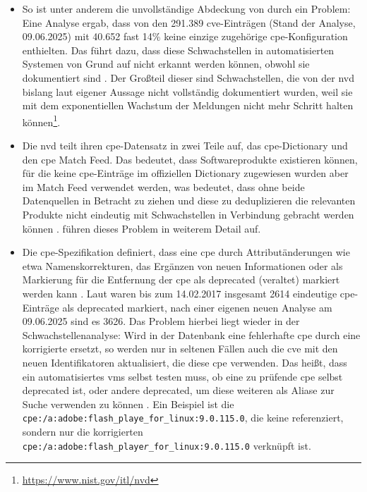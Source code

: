 \begin{itemize}
    \item So ist unter anderem die unvollständige Abdeckung von  durch  ein Problem:
    Eine Analyse ergab, dass von den 291.389 \acrshort{cve}-Einträgen (Stand der Analyse, 09.06.2025) mit 40.652 fast 14\% keine einzige zugehörige \acrshort{cpe}-Konfiguration enthielten.
    Das führt dazu, dass diese Schwachstellen in automatisierten Systemen von Grund auf nicht erkannt werden können, obwohl sie dokumentiert sind \autocite{Sanguino_Uetz_2017}.
    Der Großteil dieser  sind Schwachstellen, die von der \acrshort{nvd} bislang laut eigener Aussage nicht vollständig dokumentiert wurden, weil sie mit dem exponentiellen Wachstum der Meldungen nicht mehr Schritt halten können\footnote{\url{https://www.nist.gov/itl/nvd}}.

    \item Die \acrshort{nvd} teilt ihren \acrshort{cpe}-Datensatz in zwei Teile auf, das \acrshort{cpe}-Dictionary \autocite{Cichonski_Waltermire_Scarfone_2011} und den \acrshort{cpe} Match Feed.
    Das bedeutet, dass Softwareprodukte existieren können, für die keine \acrshort{cpe}-Einträge im offiziellen Dictionary zugewiesen wurden aber im Match Feed verwendet werden, was bedeutet, dass ohne beide Datenquellen in Betracht zu ziehen und diese zu deduplizieren die relevanten Produkte nicht eindeutig mit Schwachstellen in Verbindung gebracht werden können \autocite{Sanguino_Uetz_2017}.
    \textcite{Sanguino_Uetz_2017} führen dieses Problem in weiterem Detail auf.

    \item Die \acrshort{cpe}-Spezifikation definiert, dass eine \acrshort{cpe} durch Attributänderungen wie etwa Namenskorrekturen, das Ergänzen von neuen Informationen oder als Markierung für die Entfernung der \acrshort{cpe} als deprecated (veraltet) markiert werden kann \autocite{Cichonski_Waltermire_Scarfone_2011}.
    Laut \textcite{Sanguino_Uetz_2017} waren bis zum 14.02.2017 insgesamt 2614 eindeutige \acrshort{cpe}-Einträge als deprecated markiert, nach einer eigenen neuen Analyse am 09.06.2025 sind es 3626.
    Das Problem hierbei liegt wieder in der Schwachstellenanalyse:
    Wird in der Datenbank eine fehlerhafte \acrshort{cpe} durch eine korrigierte ersetzt, so werden nur in seltenen Fällen auch die \acrshort{cve} mit den neuen Identifikatoren aktualisiert, die diese \acrshort{cpe} verwenden.
    Das heißt, dass ein automatisiertes \acrshort{vms} selbst testen muss, ob eine zu prüfende \acrshort{cpe} selbst deprecated ist, oder andere deprecated, um diese weiteren  als Aliase zur Suche verwenden zu können \autocite{Sanguino_Uetz_2017}.
    Ein Beispiel ist die \texttt{cpe:/a:adobe:flash\_playe\_for\_linux:9.0.115.0}, die keine  referenziert, sondern nur die korrigierten \texttt{cpe:/a:adobe:flash\_playe\textit{r}\_for\_linux:9.0.115.0} verknüpft ist.


\end{itemize}
